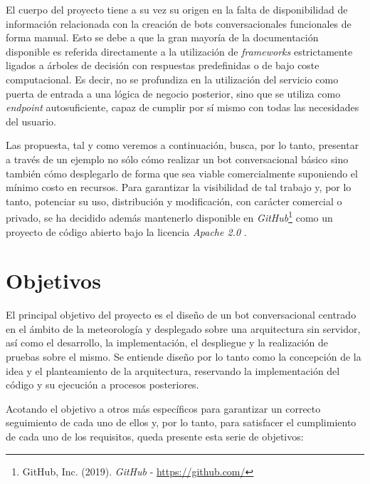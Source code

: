 \documentclass[11pt,spanish,listoffigures]{tfgetsinf}
\begin{document}
El cuerpo del proyecto tiene a su vez su origen en la falta de disponibilidad de información relacionada con la creación de bots conversacionales funcionales de forma manual. Esto se debe a que la gran mayoría de la documentación disponible es referida directamente a la utilización de \textit{frameworks} estrictamente ligados a árboles de decisión con respuestas predefinidas o de bajo coste computacional. Es decir, no se profundiza en la utilización del servicio como puerta de entrada a una lógica de negocio posterior, sino que se utiliza como \textit{\gls{endpoint}} autosuficiente, capaz de cumplir por sí mismo con todas las necesidades del usuario.  

Las propuesta, tal y como veremos a continuación, busca, por lo tanto, presentar a través de un ejemplo no sólo cómo realizar un bot conversacional básico sino también cómo desplegarlo de forma que sea viable comercialmente suponiendo el mínimo costo en recursos. Para garantizar la visibilidad de tal trabajo y, por lo tanto, potenciar su uso, distribución y modificación, con carácter comercial o privado, se ha decidido además mantenerlo disponible en \textit{GitHub}\footnote{GitHub, Inc. (2019). \textit{GitHub} - \url{https://github.com/}} como un proyecto de código abierto \cite{ptolomeo} bajo la licencia \textit{Apache 2.0} \cite{apache}.



\section{Objetivos}
\label{sec:objetivos}

El principal objetivo del proyecto es el diseño de un bot conversacional centrado en el ámbito de la meteorología y desplegado sobre una arquitectura sin servidor, así como el desarrollo, la implementación, el despliegue y la realización de pruebas sobre el mismo. Se entiende diseño por lo tanto como la concepción de la idea y el planteamiento de la arquitectura, reservando la implementación del código y su ejecución a procesos posteriores.

Acotando el objetivo a otros más específicos para garantizar un correcto seguimiento de cada uno de ellos y, por lo tanto, para satisfacer el cumplimiento de cada uno de los requisitos, queda presente esta serie de objetivos:
\end{document}
